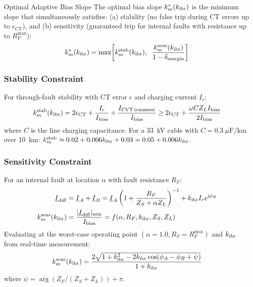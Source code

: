 \begin{thesisdef}{Optimal Adaptive Bias Slope}
The optimal bias slope $k_m^\ast(k_\mathrm{ibr})$ is the minimum slope that
simultaneously satisfies:
(a) stability (no false trip during CT errors up to $\epsilon_\mathrm{CT}$), and
(b) sensitivity (guaranteed trip for internal faults with resistance up
to $R_F^\mathrm{max}$):
\begin{equation}
  k_m^\ast(k_\mathrm{ibr}) = \max\!\left[k_m^\mathrm{stab}(k_\mathrm{ibr}),\;\;
                              \frac{k_m^\mathrm{sens}(k_\mathrm{ibr})}{1 - \delta_\mathrm{margin}}\right]
  \label{eq:ch4_km_star}
\end{equation}
\end{thesisdef}

\subsubsection{Stability Constraint}

For through-fault stability with CT error $\epsilon$ and
charging current $I_c$:
\begin{equation}
  k_m^\mathrm{stab}(k_\mathrm{ibr}) = 2\epsilon_\mathrm{CT}
    + \frac{I_c}{I_\mathrm{bias}} + \frac{I_\mathrm{CVT\,transient}}{I_\mathrm{bias}}
    \geq 2\epsilon_\mathrm{CT} + \frac{\omega C Z_L I_\mathrm{bias}}{2I_\mathrm{bias}}
  \label{eq:ch4_km_stab}
\end{equation}
where $C$ is the line charging capacitance. For a 33~kV cable with
$C = 0.3\;\mu\mathrm{F/km}$ over 10~km:
$k_m^\mathrm{stab} \approx 0.02 + 0.006k_\mathrm{ibr} + 0.03 = 0.05 + 0.006k_\mathrm{ibr}$.

\subsubsection{Sensitivity Constraint}

For an internal fault at location $\alpha$ with fault resistance $R_F$:
\begin{align}
  \underline{I}_\mathrm{diff} &= \underline{I}_A + \underline{I}_B
  = \underline{I}_A\left(1 + \frac{R_F}{Z_S + \alpha Z_L}\right)^{-1}
    + k_\mathrm{ibr} I_r e^{\mathrm{j}\phi_B}
  \label{eq:ch4_idiff_rf} \\
  k_m^\mathrm{sens}(k_\mathrm{ibr}) &=
  \frac{|\underline{I}_\mathrm{diff}|_{\min}}{I_\mathrm{bias}}
  = f(\alpha, R_F, k_\mathrm{ibr}, Z_S, Z_L)
  \label{eq:ch4_km_sens}
\end{align}
Evaluating at the worst-case operating point $(\alpha = 1.0, R_F = R_F^\mathrm{max})$
and $k_\mathrm{ibr}$ from real-time measurement:
\begin{equation}
  k_m^\mathrm{sens}(k_\mathrm{ibr}) = \frac{2\sqrt{1 + k_\mathrm{ibr}^2
    - 2k_\mathrm{ibr}\cos(\phi_A - \phi_B + \psi)}}{1 + k_\mathrm{ibr}}
  \label{eq:ch4_km_sens2}
\end{equation}
where $\psi = \arg(Z_F/(Z_S + Z_L)) + \pi$.

